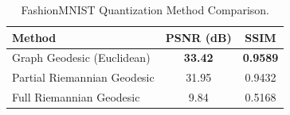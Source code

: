 \documentclass{article}
\begin{document}
\begin{table}[h!]
\caption{FashionMNIST Quantization Method Comparison.\protect\footnotemark}
\label{tab:fashion_mnist_results}
\begin{center}
\begin{footnotesize}
\begin{tabular}{l c c}
\toprule
Method & PSNR (dB) & SSIM \\
\midrule
Graph Geodesic (Euclidean) & \textbf{33.42} & \textbf{0.9589} \\
Partial Riemannian Geodesic & 31.95 & 0.9432 \\
Full Riemannian Geodesic & 9.84 & 0.5168 \\
\bottomrule
\end{tabular}
\end{footnotesize}
\end{center}
\vspace{-0.4cm}
\end{table}
\end{document}
